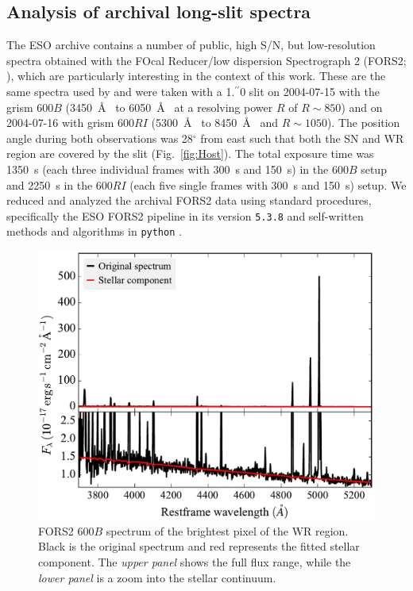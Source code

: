 \documentclass[traditabstract]{aa}
\newcommand{\farc}{\hbox{$.\!\!^{\prime\prime}$}}
\begin{document}
\begin{appendix}

\section{Analysis of archival long-slit spectra}
\label{app:fors}

The ESO archive contains a number of public, high S/N, but low-resolution spectra obtained with the FOcal Reducer/low dispersion Spectrograph 2 (FORS2; \citealt{1998Msngr..94....1A}), which are particularly interesting in the context of this work. These are the same spectra used by \citet{2006A&A...454..103H} and were taken with a 1\farc{0} slit on 2004-07-15 with the grism 600$B$ (3450~\AA~ to 6050~\AA~ at a resolving power $R$ of $R\sim850$) and on 2004-07-16 with grism 600$RI$ (5300~\AA~ to 8450~\AA~ and $R\sim1050$). The position angle during both observations was 28$^\circ$ from east such that both the SN and WR region are covered by the slit (Fig.~\ref{fig:Host}). The total exposure time was 1350~s (each three individual frames with 300~s and 150~s) in the 600$B$ setup and 2250~s in the 600$RI$ (each five single frames with 300~s and 150~s) setup. We reduced and analyzed the archival FORS2 data using standard procedures, specifically the ESO FORS2 pipeline in its version \texttt{5.3.8} and self-written methods and algorithms in \texttt{python} \citep{2015A&A...581A.125K}.

\begin{figure}
\includegraphics[angle=0, width=0.93\columnwidth]{Figs/FORS2_3700_5300_starlight.pdf}
\caption{FORS2 600$B$ spectrum of the brightest pixel of the WR region. {Black is the original spectrum and red represents the fitted stellar component. The \textit{upper panel} shows the full flux range, while the \textit{lower panel} is a zoom into the stellar continuum.}}
\label{fig:FORSWR}
\end{figure}


\end{appendix}
\end{document}
